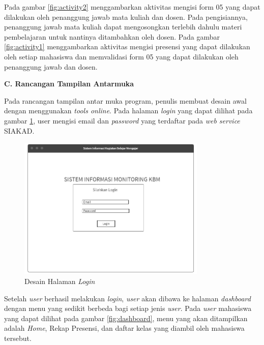 Pada gambar \ref{fig:activity2} menggambarkan aktivitas mengisi form 05 yang dapat dilakukan oleh penanggung jawab mata kuliah dan dosen. Pada pengisiannya, penanggung jawab mata kuliah dapat mengosongkan terlebih dahulu materi pembelajaran untuk nantinya ditambahkan oleh dosen.
Pada gambar \ref{fig:activity1} menggambarkan aktivitas mengisi presensi yang dapat dilakukan oleh setiap mahasiswa dan memvalidasi form 05 yang dapat dilakukan oleh penanggung jawab dan dosen.

\textbf{C. Rancangan Tampilan Antarmuka}

Pada rancangan tampilan antar muka program, penulis membuat desain awal dengan menggunakan \textit{tools online}. Pada halaman \textit{login} yang dapat dilihat pada gambar \ref{fig:login}, user mengisi email dan \textit{password} yang terdaftar pada \textit{web service} SIAKAD.

\begin{figure}[h!]
	\centering
	\includegraphics[width=0.8\textwidth]{gambar/mockup/login}
	\caption{Desain Halaman \textit{Login}}
	\label{fig:login}
\end{figure}

Setelah \textit{user} berhasil melakukan \textit{login}, \textit{user} akan dibawa ke halaman \textit{dashboard} dengan menu yang sedikit berbeda bagi setiap jenis \textit{user}. Pada \textit{user} mahasiswa yang dapat dilihat pada gambar \ref{fig:dashboard}, menu yang akan ditampilkan adalah \textit{Home}, Rekap Presensi, dan daftar kelas yang diambil oleh mahasiswa tersebut.

